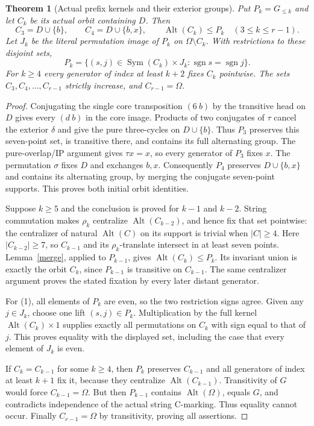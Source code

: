 \documentclass[11pt,a4paper]{article}
\newtheorem{theorem}[lemma]{Theorem}
\newcommand{\Alt}{\operatorname{Alt}}
\newcommand{\Sym}{\operatorname{Sym}}
\begin{document}
\begin{theorem}[Actual prefix kernels and their exterior groups]\label{prefix}
Put $P_k=G_{\le k}$ and let $C_k$ be its actual orbit containing
$D$. Then
\[
 C_3=D\cup\{b\},\qquad C_4=D\cup\{b,x\},\qquad
               \Alt(C_k)\le P_k\quad(3\le k\le r-1).
\]
Let $J_k$ be the literal permutation image of $P_k$ on
$\Omega\setminus C_k$. With restrictions to these disjoint sets,
\[
 P_k=\{(s,j)\in\Sym(C_k)\times J_k:
                              \operatorname{sgn}s=\operatorname{sgn}j\}.
                                                        \tag{1}
\]
For $k\ge4$ every generator of index at least $k+2$ fixes $C_k$
pointwise. The sets $C_3,C_4,\ldots,C_{r-1}$ strictly increase,
and $C_{r-1}=\Omega$.
\end{theorem}
\begin{proof}
Conjugating the single core transposition $(6\ b)$ by the
transitive head on $D$ gives every $(d\ b)$ in the core image.
Products of two conjugates of $\tau$ cancel the exterior $\delta$
and give the pure three-cycles on $D\cup\{b\}$.
Thus $P_3$ preserves this seven-point set, is transitive there,
and contains its full alternating group. The pure-overlap/IP
argument gives $\tau x=x$, so every generator of $P_3$ fixes
$x$. The permutation $\sigma$ fixes $D$ and exchanges $b,x$.
Consequently $P_4$ preserves $D\cup\{b,x\}$ and contains its
alternating group, by merging the conjugate seven-point supports.
This proves both initial orbit identities.

Suppose $k\ge5$ and the conclusion is proved for $k-1$ and
$k-2$. String commutation makes $\rho_k$ centralize
$\Alt(C_{k-2})$, and hence fix that set pointwise: the centralizer
of natural $\Alt(C)$ on its support is trivial when $|C|\ge4$.
Here $|C_{k-2}|\ge7$, so $C_{k-1}$ and its $\rho_k$-translate
intersect in at least seven points. Lemma~\ref{merge}, applied
to $P_{k-1}$, gives $\Alt(C_k)\le P_k$. Its invariant union is
exactly the orbit $C_k$, since $P_{k-1}$ is transitive on $C_{k-1}$.
The same centralizer argument proves the stated fixation by every
later distant generator.

For (1), all elements of $P_k$ are even, so the two restriction
signs agree. Given any $j\in J_k$, choose one lift $(s,j)\in P_k$.
Multiplication by the full kernel $\Alt(C_k)\times1$ supplies
exactly all permutations on $C_k$ with sign equal to that of $j$.
This proves equality with the displayed set, including the case
that every element of $J_k$ is even.

If $C_k=C_{k-1}$ for some $k\ge4$, then $P_k$ preserves
$C_{k-1}$ and all generators of index at least $k+1$ fix it,
because they centralize $\Alt(C_{k-1})$. Transitivity of $G$
would force $C_{k-1}=\Omega$. But then $P_{k-1}$ contains
$\Alt(\Omega)$, equals $G$, and contradicts independence of the
actual string C-marking. Thus equality cannot occur. Finally
$C_{r-1}=\Omega$ by transitivity, proving all assertions.
\end{proof}
\end{document}
